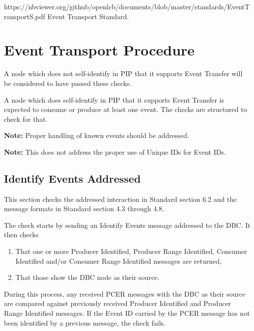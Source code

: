 



\maketitle
\thispagestyle{firststyle}

\introductionCaveats
    {https://nbviewer.org/github/openlcb/documents/blob/master/standards/EventTransportS.pdf}
    {Event Transport Standard}.

\section{Event Transport Procedure}


A node which does not self-identify in PIP that it supports
Event Transfer will be considered to have passed these checks.
\pipsetFootnote

A node which does self-identify in PIP that it supports 
Event Transfer is expected to consume or produce at least 
one event.  The checks are structured to check for that.

\textbf{Note:}  Proper handling of known events should be addressed.

\textbf{Note:}  This does not address the proper use of Unique IDs for Event IDs.

\subsection{Identify Events Addressed}

This section checks the addressed interaction in Standard section 6.2 and
the message formats in Standard section 4.3 through 4.8.

The check starts by sending an Identify Events message addressed to the DBC.
It then checks

\begin{enumerate}
\item That one or more Producer Identified, Producer Range Identified, 
        Consumer Identified and/or Consumer Range Identified messages are returned,
\item That those show the DBC node as their source.
\end{enumerate}

During this process,  any received PCER messages with the DBC as their source are compared against
previously received Producer Identified and Producer Range Identified messages.
If the Event ID carried by the PCER message has not been identified by 
a previous message, the check fails.


